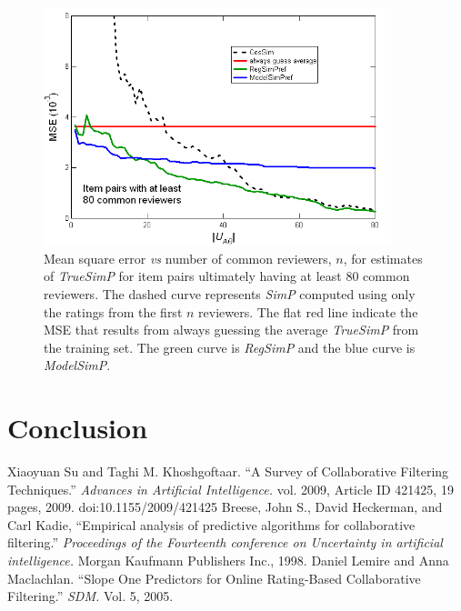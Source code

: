 \documentclass[11pt]{article}
\begin{document}
\begin{figure}[!htbp]
    \centering
    \includegraphics[width=0.9\textwidth]{MSE_SimP_80.png}
	\caption{Mean square error {\em vs} number of common reviewers, $n$, for
estimates of {\em TrueSimP} for item pairs ultimately having at least 80 common
reviewers. The dashed curve represents
{\em SimP} computed using only the ratings from the first $n$ reviewers. The
flat red line indicate the MSE that results from always guessing the average
{\em TrueSimP} from the training set. The green curve is {\em RegSimP} and the
blue curve is {\em ModelSimP}. }
    \label{fig:MSE_SimP}
\end{figure}

\section*{Conclusion}
\begin{thebibliography}{9}

    Xiaoyuan Su and Taghi M. Khoshgoftaar.
    ``A Survey of Collaborative Filtering Techniques.''
    \emph{Advances in Artificial Intelligence.} vol. 2009,
    Article ID 421425, 19 pages, 2009. doi:10.1155/2009/421425
    Breese, John S., David Heckerman, and Carl Kadie, 
    ``Empirical analysis of predictive algorithms for collaborative filtering.'' 
    \emph{Proceedings of the Fourteenth conference on Uncertainty in artificial intelligence.}
    Morgan Kaufmann Publishers Inc., 1998.
    Daniel Lemire and Anna Maclachlan.
    ``Slope One Predictors for Online Rating-Based Collaborative Filtering.''
    \emph{SDM.} Vol. 5, 2005.

\end{thebibliography}
\end{document}
